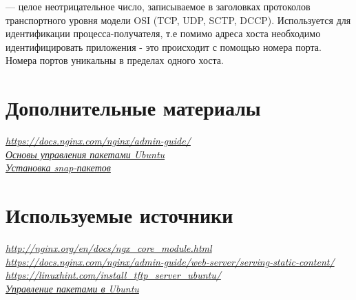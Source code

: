 \documentclass[14pt, a4paper]{article}
\begin{document}
\noindent \href{https://ru.wikipedia.org/wiki/Порт_(компьютерные_сети)}{} — целое неотрицательное число, записываемое в заголовках протоколов транспортного уровня
модели OSI (TCP, UDP, SCTP, DCCP). Используется для идентификации процесса-получателя, т.е
помимо адреса хоста необходимо идентифицировать приложения - это происходит с помощью
номера порта. Номера портов уникальны в пределах одного хоста.

\section*{Дополнительные материалы} 

\href{https://docs.nginx.com/nginx/admin-guide/}{\textit{https://docs.nginx.com/nginx/admin-guide/}} \\

\noindent \href{https://devacademy.ru/article/osnovyi-upravleniya-paketami-v-ubuntu-i-debian}{\textit{Основы управления пакетами Ubuntu}} \\

\noindent \href{https://losst.pro/ustanovka-snap-paketov-ubuntu}{\textit{Установка snap-пакетов}}

\section*{Используемые источники} 

\href{http://nginx.org/en/docs/ngx_core_module.html}{\textit{http://nginx.org/en/docs/ngx\_core\_module.html}} \\

\noindent \href{https://docs.nginx.com/nginx/admin-guide/web-server/serving-static-content/}{\textit{https://docs.nginx.com/nginx/admin-guide/web-server/serving-static-content/}} \\

\noindent \href{https://linuxhint.com/install_tftp_server_ubuntu/}{\textit{https://linuxhint.com/install\_tftp\_server\_ubuntu/}} \\

\noindent \href{https://help.ubuntu.ru/wiki/руководство_по_ubuntu_server/управление_пакетами}{\textit{Управление пакетами в Ubuntu}}
\end{document}
